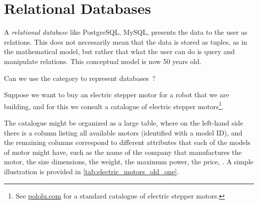
\section{Relational Databases}
\label{sec:relational-databases}



    A \emph{relational database} like PostgreSQL, MySQL, \etc presents the data to the user as relations.
    This does not necessarily mean that the data is stored as tuples, as in the mathematical model, but rather that what the user can do is query and manipulate relations.
    This conceptual model is now 50 years old.

    Can we use the category \Rel to represent databases~\cite{codd2002relational}?

    Suppose we want to buy an electric stepper motor for a robot that we are building, and for this we consult a catalogue of electric stepper motors\footnote{See \href{https://www.pololu.com/category/87/stepper-motors}{pololu.com} for a standard catalogue of electric stepper motors.
    }.

    The catalogue might be organized as a large table, where on the left-hand side there is a column listing all available motors (identified with a model ID), and the remaining columns correspond to different attributes that each of the models of motor might have, such as the name of the company that manufactures the motor, the size dimensions, the weight, the maximum power, the price, \etc.
    A simple illustration is provided in \cref{tab:electric_motors_old_one}.

